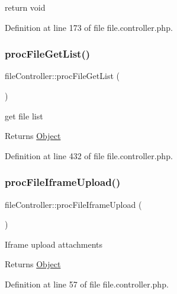 \begin{DoxyPre}return void
\end{DoxyPre}


Definition at line 173 of file file.\+controller.\+php.

\mbox{\label{classfileController_ad1cdb6696de4e0c90532412bb80a359e}} 
\subsubsection{\texorpdfstring{proc\+File\+Get\+List()}{procFileGetList()}}
{\footnotesize\ttfamily file\+Controller\+::proc\+File\+Get\+List (\begin{DoxyParamCaption}{ }\end{DoxyParamCaption})}

get file list

\begin{DoxyReturn}{Returns}
\hyperlink{classObject}{Object} 
\end{DoxyReturn}


Definition at line 432 of file file.\+controller.\+php.

\mbox{\label{classfileController_a423c909fc5841f83d9a965839180aad5}} 
\subsubsection{\texorpdfstring{proc\+File\+Iframe\+Upload()}{procFileIframeUpload()}}
{\footnotesize\ttfamily file\+Controller\+::proc\+File\+Iframe\+Upload (\begin{DoxyParamCaption}{ }\end{DoxyParamCaption})}

Iframe upload attachments

\begin{DoxyReturn}{Returns}
\hyperlink{classObject}{Object} 
\end{DoxyReturn}


Definition at line 57 of file file.\+controller.\+php.

\mbox{\label{classfileController_a29e461f3cb7a84ddbb07b0abcdeef2e5}} 
